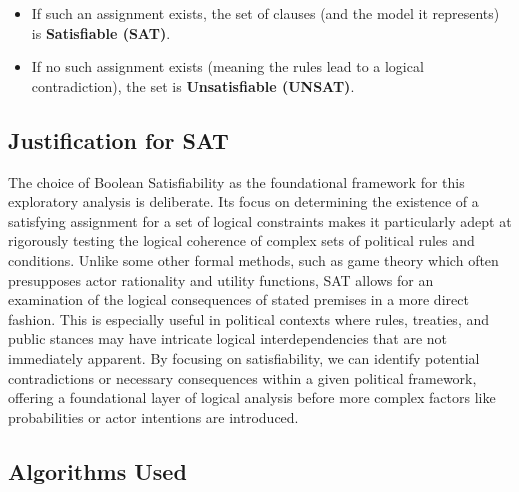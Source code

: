 \documentclass[11pt, a4paper]{article}
\begin{document}
\begin{itemize}
    \begin{itemize}
        \item If such an assignment exists, the set of clauses (and the model it represents) is \textbf{Satisfiable (SAT)}.
        \item If no such assignment exists (meaning the rules lead to a logical contradiction), the set is \textbf{Unsatisfiable (UNSAT)}.
    \end{itemize}
\end{itemize}

\subsection*{Justification for SAT}
The choice of Boolean Satisfiability as the foundational framework for this exploratory analysis is deliberate. Its focus on determining the existence of a satisfying assignment for a set of logical constraints makes it particularly adept at rigorously testing the logical coherence of complex sets of political rules and conditions. Unlike some other formal methods, such as game theory which often presupposes actor rationality and utility functions, SAT allows for an examination of the logical consequences of stated premises in a more direct fashion. This is especially useful in political contexts where rules, treaties, and public stances may have intricate logical interdependencies that are not immediately apparent. By focusing on satisfiability, we can identify potential contradictions or necessary consequences within a given political framework, offering a foundational layer of logical analysis before more complex factors like probabilities or actor intentions are introduced.

\subsection*{Algorithms Used}
\end{document}
